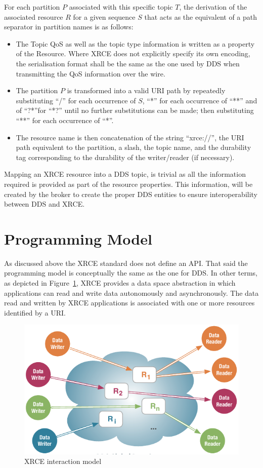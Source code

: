 \documentclass[a4paper,oneside,article]{memoir}
\begin{document}
For each partition $P$ associated with this specific topic $T$, the derivation of the associated
resource $R$ for a given sequence $S$ that acts as the equivalent of a path separator in partition
names is as follows:
\begin{itemize}
\item The Topic QoS as well as the topic type information is written as a property of the Resource.
  Where XRCE does not explicitly specify its own encoding, the serialisation format shall be the
  same as the one used by DDS when transmitting the QoS information over the wire.
\item The partition $P$ is transformed into a valid URI path by repeatedly substituting ``/'' for
  each occurrence of $S$, ``*'' for each occurrence of ``**'' and of ``?*''for ``*?'' until no
  further substitutions can be made; then substituting ``**'' for each occurrence of ``*''.
\item The resource name is then concatenation of the string ``xrce://'', the URI path equivalent to
  the partition, a slash, the topic name, and the durability tag corresponding to the durability of
  the writer/reader (if necessary).
\end{itemize}
Mapping an XRCE resource into a DDS topic, is trivial as all the information required is provided as
part of the resource properties.  This information, will be created by the broker to create the
proper DDS entities to ensure interoperability between DDS and XRCE.

\section{Programming Model}

As discussed above the XRCE standard does not define an API\@.  That said the programming model is
conceptually the same as the one for DDS\@.  In other terms, as depicted in
Figure~\ref{fig:interaction-model}, XRCE provides a data space abstraction in which applications can
read and write data autonomously and asynchronously.  The data read and written by XRCE applications
is associated with one or more resources identified by a URI\@.

\begin{figure}
  \centering
  \includegraphics[scale=0.8]{xrce-interaction-model.pdf}
  \caption{XRCE interaction model}\label{fig:interaction-model}
\end{figure}
\end{document}
